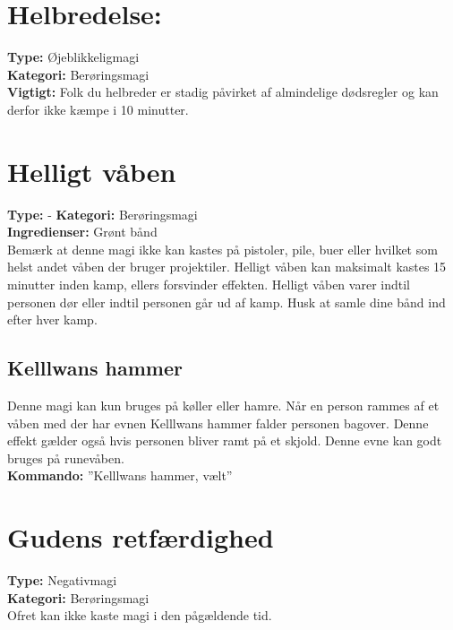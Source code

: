 \section*{Helbredelse:}
\textbf{Type:} Øjeblikkeligmagi\\ 
\textbf{Kategori:} Berøringsmagi\\
\textbf{Vigtigt:} Folk du helbreder er stadig påvirket af almindelige dødsregler og kan derfor ikke kæmpe i 10 minutter.

\section*{Helligt våben}
\textbf{Type:} -
\textbf{Kategori:} Berøringsmagi\\
\textbf{Ingredienser:} Grønt bånd\\
Bemærk at denne magi ikke kan kastes på pistoler, pile, buer eller hvilket som helst andet våben der bruger projektiler. Helligt våben kan maksimalt kastes 15 minutter inden kamp, ellers forsvinder effekten. Helligt våben varer indtil personen dør eller indtil personen går ud af kamp. Husk at samle
dine bånd ind efter hver kamp.\\

\subsection*{Kelllwans hammer}
Denne magi kan kun bruges på køller eller hamre. Når en person rammes af et våben med der har evnen Kelllwans hammer falder personen bagover. Denne effekt gælder også hvis personen bliver ramt på et skjold. Denne evne kan godt bruges på runevåben.\\ 
\textbf{Kommando:} ”Kelllwans hammer, vælt”

\section*{Gudens retfærdighed}
\textbf{Type:} Negativmagi\\ 
\textbf{Kategori:} Berøringsmagi\\
Ofret kan ikke kaste magi i den pågældende tid.
